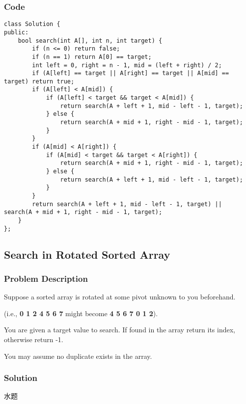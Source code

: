 \documentclass[courier]{article}
\begin{document}
\begin{CJK*}{UTF8}{gkai}
\subsubsection*{Code}
\begin{lstlisting}
class Solution {
public:
    bool search(int A[], int n, int target) {
        if (n <= 0) return false;
        if (n == 1) return A[0] == target;
        int left = 0, right = n - 1, mid = (left + right) / 2;
        if (A[left] == target || A[right] == target || A[mid] == target) return true;
        if (A[left] < A[mid]) {
            if (A[left] < target && target < A[mid]) {
                return search(A + left + 1, mid - left - 1, target);
            } else {
                return search(A + mid + 1, right - mid - 1, target);
            }
        }
        if (A[mid] < A[right]) {
            if (A[mid] < target && target < A[right]) {
                return search(A + mid + 1, right - mid - 1, target);
            } else {
                return search(A + left + 1, mid - left - 1, target);
            }
        }
        return search(A + left + 1, mid - left - 1, target) || search(A + mid + 1, right - mid - 1, target);
    }
}; 
\end{lstlisting}


\subsection{ Search in Rotated Sorted Array }

\subsubsection*{Problem Description}
Suppose a sorted array is rotated at some pivot unknown to you beforehand.

(i.e., \textbf{0 1 2 4 5 6 7} might become \textbf{4 5 6 7 0 1 2}).

You are given a target value to search. If found in the array return its index, otherwise return -1.

You may assume no duplicate exists in the array.



\subsubsection*{Solution}
水题


\end{CJK*}
\end{document}
